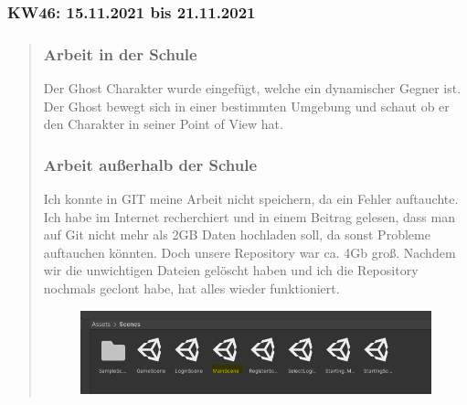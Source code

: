 
\subsubsection{KW46: 15.11.2021 bis 21.11.2021}
\begin{quote}
	\subsubsection*{Arbeit in der Schule}
	Der Ghost Charakter wurde eingefügt, welche ein dynamischer Gegner ist. Der Ghost bewegt sich in einer bestimmten Umgebung und schaut ob er den Charakter in seiner Point of View hat. 
	\subsubsection*{Arbeit außerhalb der Schule}
	Ich konnte in GIT meine Arbeit nicht speichern, da ein Fehler auftauchte.
	Ich habe im Internet recherchiert und in einem Beitrag gelesen, dass man auf Git nicht mehr als 2GB Daten hochladen soll, da sonst Probleme auftauchen könnten. Doch unsere Repository war ca. 4Gb groß. Nachdem wir die unwichtigen Dateien gelöscht haben und ich die Repository nochmals geclont habe, hat alles wieder funktioniert. 
	
	\begin{figure}
		\centering
		\includegraphics[width=0.7\linewidth]{img/SemihSoenmez_IMG/KW47_unity_scenes2}
		\caption{}
		\label{fig:kw47unityscenes2}
	\end{figure}
\end{quote}
